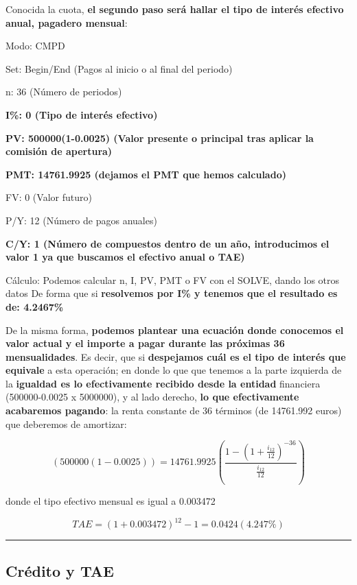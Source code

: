 \documentclass[
  letterpaper,
  DIV=11,
  numbers=noendperiod]{scrreprt}
\begin{document}
\begin{tcolorbox}
\begin{tcolorbox}
Conocida la cuota, \textbf{el segundo paso será hallar el tipo de
interés efectivo anual, pagadero mensual}:

Modo: CMPD

Set: Begin/End (Pagos al inicio o al final del periodo)

n: 36 (Número de periodos)

\textbf{I\%: 0 (Tipo de interés efectivo)}

\textbf{PV: 500000(1-0.0025) (Valor presente o principal tras aplicar la
comisión de apertura)}

\textbf{PMT: 14761.9925 (dejamos el PMT que hemos calculado)}

FV: 0 (Valor futuro)

P/Y: 12 (Número de pagos anuales)

\textbf{C/Y: 1 (Número de compuestos dentro de un año, introducimos el
valor 1 ya que buscamos el efectivo anual o TAE)}

Cálculo: Podemos calcular n, I, PV, PMT o FV con el SOLVE, dando los
otros datos De forma que si \textbf{resolvemos por I\% y tenemos que el
resultado es de: 4.2467\%}

De la misma forma, \textbf{podemos plantear una ecuación donde conocemos
el valor actual y el importe a pagar durante las próximas 36
mensualidades}. Es decir, que si \textbf{despejamos cuál es el tipo de
interés que equivale} a esta operación; en donde lo que que tenemos a la
parte izquierda de la \textbf{igualdad es lo efectivamente recibido
desde la entidad} financiera (500000-0.0025 x 5000000), y al lado
derecho, \textbf{lo que efectivamente acabaremos pagando}: la renta
constante de 36 términos (de 14761.992 euros) que deberemos de
amortizar:

\[\left(500000\left(1-0.0025\right)\right)=14761.9925\left(\frac{1-\left(1+\frac{i_{12}}{12}\right)^{-36}}{\frac{i_{12}}{12}}\right)\]

donde el tipo efectivo mensual es igual a 0.003472

\[TAE=(1+0.003472)^{12}-1=0.0424(4.247\%)\]

\end{tcolorbox}

\begin{center}\rule{0.5\linewidth}{0.5pt}\end{center}

\subsection{Crédito y TAE}\label{cruxe9dito-y-tae}


\end{tcolorbox}
\end{document}
